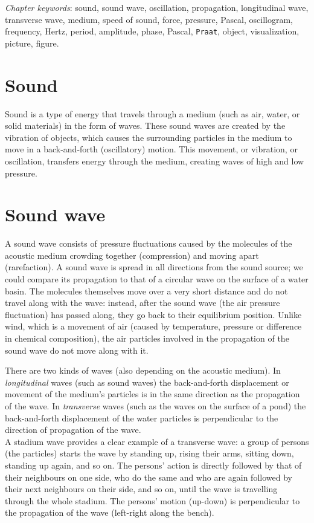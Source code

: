 \documentclass[
]{book}
\begin{document}
\emph{Chapter keywords}: sound, sound wave, oscillation, propagation, longitudinal wave, transverse wave, medium, speed of sound, force, pressure, Pascal, oscillogram, frequency, Hertz, period, amplitude, phase, Pascal, \texttt{Praat}, object, visualization, picture, figure.

\section{Sound}\label{sound}

Sound is a type of energy that travels through a medium (such as air, water, or solid materials) in the form of waves. These sound waves are created by the vibration of objects, which causes the surrounding particles in the medium to move in a back-and-forth (oscillatory) motion. This movement, or vibration, or oscillation, transfers energy through the medium, creating waves of high and low pressure.

\section{Sound wave}\label{sec:soundwave}

A sound wave consists of pressure fluctuations caused by the molecules of the acoustic medium crowding together (compression) and moving apart (rarefaction). A sound wave is spread in all directions from the sound source; we could compare its propagation to that of a circular wave on the surface of a water basin. The molecules themselves move over a very short distance and do not travel along with the wave: instead, after the sound wave (the air pressure fluctuation) has passed along, they go back to their equilibrium position. Unlike wind, which is a movement of air (caused by temperature, pressure or difference in chemical composition), the air particles involved in the propagation of the sound wave do not move along with it.

There are two kinds of waves (also depending on the acoustic medium). In \emph{longitudinal} waves (such as sound waves) the back-and-forth displacement or movement of the medium's particles is in the same direction as the propagation of the wave. In \emph{transverse} waves (such as the waves on the surface of a pond) the back-and-forth displacement of the water particles is perpendicular to the direction of propagation of the wave.\\
A stadium wave provides a clear example of a transverse wave: a group of persons (the particles) starts the wave by standing up, rising their arms, sitting down, standing up again, and so on. The persons' action is directly followed by that of their neighbours on one side, who do the same and who are again followed by their next neighbours on their side, and so on, until the wave is travelling through the whole stadium. The persons' motion (up-down) is perpendicular to the propagation of the wave (left-right along the bench).
\end{document}
